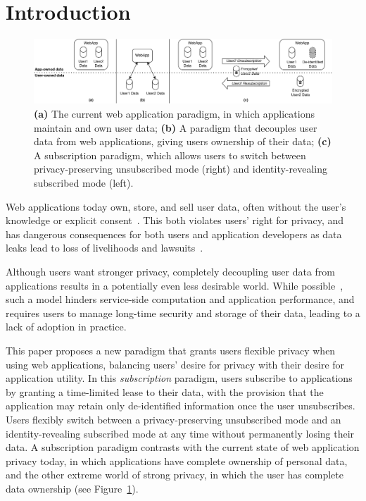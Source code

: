 \section{Introduction}

\begin{figure}[ht!]
    \centering
    \includegraphics[width=\textwidth]{img/worlds}

    \caption{\textbf{(a)} The current web application paradigm, in which applications maintain and
    own user data; \textbf{(b)} A paradigm that decouples user data from web applications, giving users ownership of their data;
    \textbf{(c)} A subscription paradigm, which allows users to switch between privacy-preserving unsubscribed mode (right) and identity-revealing subscribed mode (left).}
    \label{fig:world}
\end{figure}

Web applications today own, store, and sell user data, often without the user's knowledge or
explicit consent~\cite{nytimes:fb, npr:data}. This both violates users' right for privacy, and has
dangerous consequences for both users and application developers as data leaks lead to loss of
livelihoods and lawsuits~\cite{breach:amazon,breach:twitter, breach:fb, breach:marriott,
breach:quora}. 

Although users want stronger privacy, completely decoupling user data from applications results in a
potentially even less desirable world. While possible~\cite{solid, amber, w5, blockstack, bstore}, such a
model hinders service-side computation and application performance, and requires users to manage
long-time security and storage of their data, leading to a lack of adoption in practice.  

This paper proposes a new paradigm that grants users flexible privacy when using web applications,
balancing users' desire for privacy with their desire for application utility. In this
\emph{subscription} paradigm, users subscribe to applications by granting a time-limited lease to
their data, with the provision that the application may retain only de-identified information once
the user unsubscribes. Users flexibly switch between a privacy-preserving unsubscribed mode and an
identity-revealing subscribed mode at any time without permanently losing their data. A
subscription paradigm contrasts with the current state of web application privacy today, in which
applications have complete ownership of personal data, and the other extreme world of strong
privacy, in which the user has complete data ownership (see Figure~\ref{fig:world}). 

